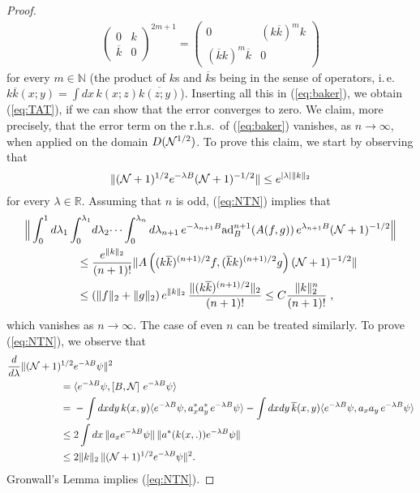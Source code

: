 \documentclass[11pt,a4paper]{article}
\newcommand{\bR}{{\mathbb R}}
\newcommand{\bN}{{\mathbb N}}
\newcommand{\cN}{{\cal N}}
\newcommand{\di}{{d}}		%
\newcommand{\cc}[1]{\overline{#1}}	%
\begin{document}
\begin{proof}
\[\begin{split}
\left(  \begin{array}{ll} 0 &  k  \\ \overline{k} & 0 \end{array} \right)^{2m+1} = \left(  \begin{array}{ll} 0 & (k \overline{k})^m k \\  (\overline{k} k)^m \overline{k} & 0 \end{array} \right) 
\end{split} \]
for every $m \in \bN$ (the product of $k$s and $\cc k$s being in the sense of operators, i.\,e.\ $k\cc k(x;y) = \int \di x\, k(x;z)\overline{k(z;y)}$). Inserting all this in (\ref{eq:baker}), we obtain (\ref{eq:TAT}), if we can show that the error converges to zero. We claim, more precisely, that the error term on the r.h.s.\ of (\ref{eq:baker}) vanishes, as $n \to \infty$, when applied on the domain $D(\cN^{1/2})$. 
To prove this claim, we start by observing that
\begin{equation}\label{eq:NTN} \| (\cN+1)^{1/2} e^{-\lambda B} (\cN+1)^{-1/2} \|%
\leq e^{|\lambda| \| k \|_2} \end{equation}
for every $\lambda \in \bR$. Assuming that $n$ is odd, (\ref{eq:NTN}) implies that 
\[ \begin{split} \Big\| \int_0^1 d\lambda_1 \int_0^{\lambda_1} &d\lambda_2 \dots \int_0^{\lambda_{n}} d\lambda_{n+1} \, e^{-\lambda_{n+1} B}  \text{ad}_B^{n+1} (A (f,g)) \, e^{\lambda_{n+1} B} (\cN +1)^{-1/2} \Big\| \\ \leq \; & \frac{e^{\| k \|_2}}{(n+1)!}  \| A \left( (k\overline{k})^{(n+1)/2} f , (\overline{k} k)^{(n+1)/2} g \right) (\cN+1)^{-1/2} \| \\
\leq \; & (\| f \|_2 + \| g \|_2) \, e^{\| k \|_2} \, \frac{\| (k\overline{k})^{(n+1)/2} \|_2}{(n+1)!} \leq C \frac{\| k \|_2^n}{(n+1)!}\;,
\end{split}\]
which vanishes as $n \to \infty$. The case of even $n$ can be treated similarly. To prove (\ref{eq:NTN}), we observe that 
\[ \begin{split} \frac{d}{d\lambda} \| (\cN+1)^{1/2} & e^{-\lambda B} \psi \|^2  \\
 =\; & \langle e^{-\lambda B} \psi, \left[ B , \cN \right] \, e^{-\lambda B} \psi \rangle \\
 = \; & -\int dx dy \,  k(x,y) \langle e^{-\lambda B} \psi, a_x^* a_y^* \, e^{-\lambda B} \psi \rangle - \int dx dy \, \overline{k} (x,y) \langle e^{-\lambda B} \psi, a_x a_y \, e^{-\lambda B} \psi \rangle \\ 
\leq \; & 2\int dx \, \| a_x e^{-\lambda B} \psi \| \, \| a^* (k(x,.)) e^{-\lambda B} \psi \| \\ 
\leq \; &2 \| k \|_2 \,  \| (\cN+1)^{1/2} e^{-\lambda B} \psi \|^2.
\end{split} \]
Gronwall's Lemma implies (\ref{eq:NTN}).   


\end{proof}
\end{document}
